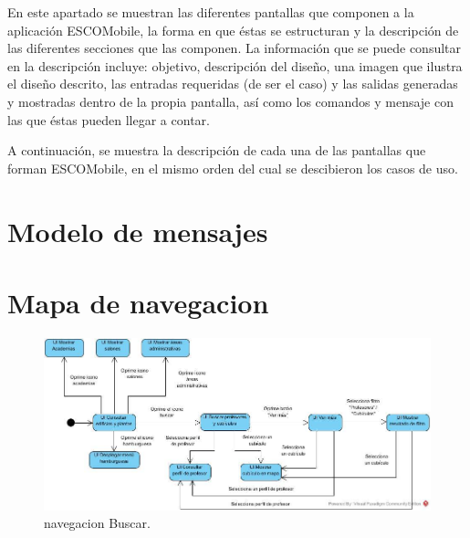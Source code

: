 \documentclass[oneside,10pt]{book}
\begin{document}
\noindent
En este apartado se muestran las diferentes pantallas que componen a la aplicación ESCOMobile,
la forma en que éstas se estructuran y la descripción de las diferentes secciones que las componen.
La información que se puede consultar en la descripción incluye: objetivo, descripción del diseño, 
una imagen que ilustra el diseño descrito, las entradas requeridas (de ser el caso) y las salidas
generadas y mostradas dentro de la propia pantalla, así como los comandos y mensaje con las que
éstas pueden llegar a contar.

\noindent
\newline
A continuación, se muestra la descripción de cada una de las pantallas que forman ESCOMobile,
en el mismo orden del cual se descibieron los casos de uso.




\chapter{Modelo de mensajes}


\chapter{Mapa de navegacion}

	\begin{figure}[htbp!]
		\centering
			\includegraphics[width=.5\textwidth]{mapa_nave/imagenesnav/buscar1}
		\caption{navegacion Buscar.}
	\end{figure}
	
\end{document}
